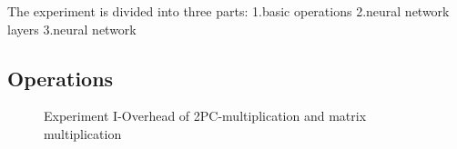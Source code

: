 \documentclass[letterpaper]{article} %
\begin{document}
    The experiment is divided into three parts: 1.basic operations 2.neural network layers 3.neural network

    \subsection{Operations}


    \begin{figure}[htbp]	
        \caption{Experiment I-Overhead of 2PC-multiplication and matrix multiplication}
        \label{multiplication and matrix multiplication}

    \end{figure}
\end{document}
